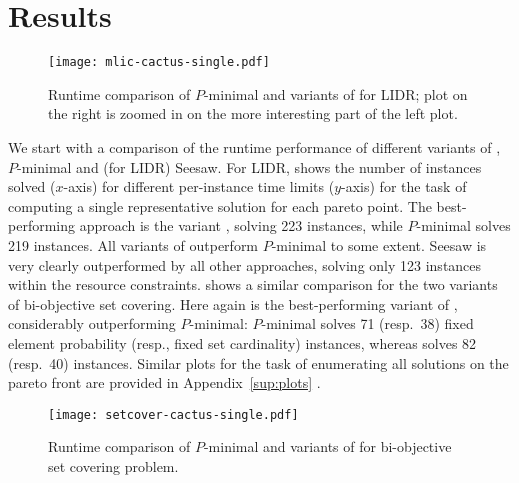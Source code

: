 \section{Results\label{sec:results}}

\begin{figure}
    \centering
    \texttt{[image: mlic-cactus-single.pdf]}
    \caption{Runtime comparison of  $P$-minimal and variants of \algname{} for LIDR; plot on the right
      is zoomed in on the more interesting part of the left plot.
    }\label{fig:mlic-cactus}
\end{figure}

We start with a comparison of the runtime performance of different variants of \algname{}, $P$-minimal and (for LIDR) Seesaw.
For LIDR,  shows the number of instances solved ($x$-axis) for different per-instance time limits ($y$-axis) for the task of computing a single representative solution for each pareto point.
The best-performing approach is the \algname{} variant \msh{}, solving 223 instances, while $P$-minimal solves 219 instances.
All  variants of \algname{} outperform $P$-minimal to some extent.
Seesaw is very clearly outperformed by all other approaches, solving only 123 instances within the resource constraints.
 shows a similar comparison for the two variants of bi-objective set covering.
Here again \msh{} is the best-performing variant of \algname{}, considerably outperforming $P$-minimal:
$P$-minimal solves 71 (resp.~38) fixed element probability (resp., fixed set cardinality) instances, whereas \msh{} solves 82 (resp.~40) instances.
Similar plots for the task of enumerating all solutions on the pareto front are provided in Appendix~\ref{sup:plots} .

\begin{figure}
    \centering
    \texttt{[image: setcover-cactus-single.pdf]}
    \caption{Runtime comparison of $P$-minimal and variants of \algname{} for  bi-objective set covering problem.
    }\label{fig:setcover-cactus}
\end{figure}


